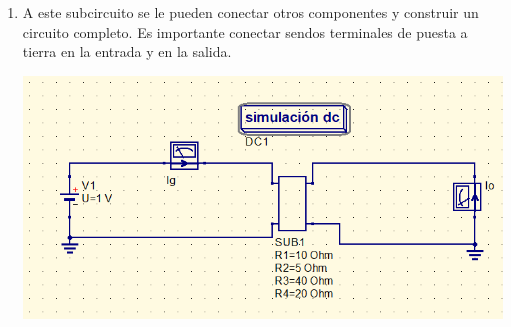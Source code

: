 \documentclass[a4paper,10pt]{article} %
\begin{document}
\begin{enumerate}
\item A este subcircuito se le pueden conectar otros componentes y construir un circuito completo. Es importante conectar sendos terminales de puesta a tierra en la entrada y en la salida.

  \begin{center}
    \includegraphics[width=\linewidth]{../figs/SubcircuitoTierra.png}
  \end{center}
  

\end{enumerate}
\end{document}

